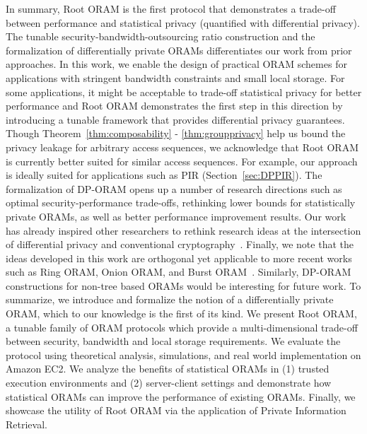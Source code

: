 \documentclass[USenglish,oneside,twocolumn]{article}
\makeatletter
\newcommand{\ourprotocol}{Root ORAM}
\let\origsection\section
\renewcommand\section{\@ifstar{\starsection}{\nostarsection}}
\newcommand\nostarsection[1]
{\sectionprelude\origsection{#1}\sectionpostlude}
\newcommand\starsection[1]
{\sectionprelude\origsection*{#1}\sectionpostlude}
\newcommand\sectionprelude{\vspace{-1em}
}
\newcommand\sectionpostlude{\vspace{-1em}
}
\makeatother
\begin{document}
In summary, \ourprotocol{} is the first protocol that demonstrates a trade-off between performance and statistical privacy (quantified with differential privacy). The tunable security-bandwidth-outsourcing ratio construction and the formalization of differentially private ORAMs differentiates our work from prior approaches.  \vspace{-5mm}
\section{Limitations}\label{sec:futurework}
In this work, we enable the design of practical ORAM schemes for applications with 
stringent bandwidth constraints and small local storage. For some applications, it 
might be acceptable to trade-off statistical privacy for better performance and 
\ourprotocol{} demonstrates the first step in this direction by introducing a 
tunable framework that provides differential privacy guarantees. 
Though Theorem~\ref{thm:composability} - \ref{thm:groupprivacy} help us bound the privacy leakage for arbitrary 
access sequences, we acknowledge that \ourprotocol{} is currently better suited for similar access sequences. For example, our approach is ideally suited for applications such as PIR (Section~\ref{sec:DPPIR}). 
The formalization of DP-ORAM opens up a number of research directions such as optimal security-performance trade-offs, rethinking lower bounds for statistically private ORAMs, as well as better performance improvement results. Our work has already inspired other researchers to rethink research ideas at the intersection of differential privacy and conventional cryptography~\cite{mazloom2017differentially,chan2018foundations}.
Finally, we note that the ideas developed in this work are orthogonal yet applicable to more recent works such as Ring ORAM, Onion ORAM, and Burst ORAM~\cite{ringoram, onionoram,burstoram}. Similarly, DP-ORAM constructions for non-tree based ORAMs would be interesting for future work.
 \section{Conclusions}\label{sec:conclusion}
To summarize, we introduce and formalize the notion of a differentially private ORAM, which to our knowledge is the first of its kind. We present \ourprotocol{}, a tunable family of ORAM protocols which provide a multi-dimensional trade-off between security, bandwidth and local storage requirements. We evaluate the protocol using theoretical analysis, simulations, and real world implementation on Amazon EC2. 
We analyze the benefits of statistical ORAMs in (1) trusted execution environments and (2) server-client settings and demonstrate how statistical ORAMs can improve the performance of existing ORAMs. Finally, we showcase the utility of \ourprotocol{} via the application of Private Information Retrieval.
 
\end{document}

